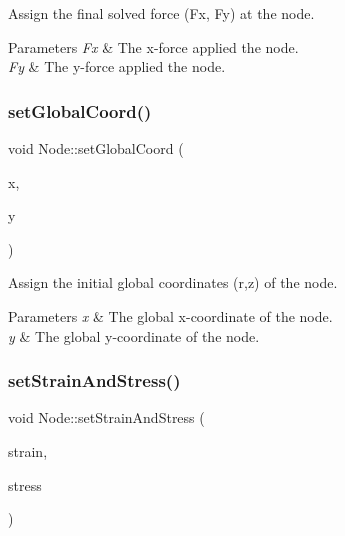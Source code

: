 Assign the final solved force (Fx, Fy) at the node. 


\begin{DoxyParams}{Parameters}
{\em Fx} & The x-\/force applied the node. \\
\hline
{\em Fy} & The y-\/force applied the node. \\
\hline
\end{DoxyParams}
\mbox{\label{class_node_acea5ca0209b0c5cffa48d564320e4d56}} 
\subsubsection{\texorpdfstring{set\+Global\+Coord()}{setGlobalCoord()}}
{\footnotesize\ttfamily void Node\+::set\+Global\+Coord (\begin{DoxyParamCaption}\item[{const double \&}]{x,  }\item[{const double \&}]{y }\end{DoxyParamCaption})}



Assign the initial global coordinates (r,z) of the node. 


\begin{DoxyParams}{Parameters}
{\em x} & The global x-\/coordinate of the node. \\
\hline
{\em y} & The global y-\/coordinate of the node. \\
\hline
\end{DoxyParams}
\mbox{\label{class_node_a31e8635344b96ab5df9e6df5e5466533}} 
\subsubsection{\texorpdfstring{set\+Strain\+And\+Stress()}{setStrainAndStress()}}
{\footnotesize\ttfamily void Node\+::set\+Strain\+And\+Stress (\begin{DoxyParamCaption}\item[{const Vector\+Xd \&}]{strain,  }\item[{const Vector\+Xd \&}]{stress }\end{DoxyParamCaption})}



